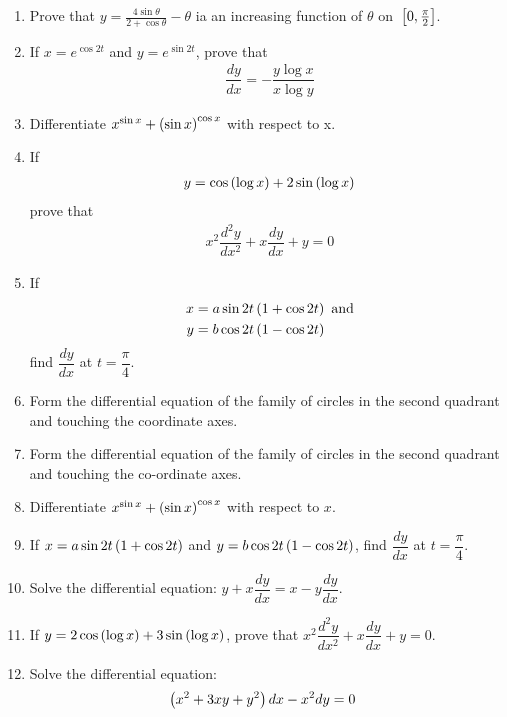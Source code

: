 \begin{enumerate}
    \item Prove that $ y = \frac{4\sin \theta}{2+ \cos \theta} - \theta$ ia an increasing function of $\theta$ on ${}\left[0,\frac{\pi}{2}\right]$.
    \item If $x=e^{\cos 2t}$ and $y=e^{\sin 2t}$, prove that
          \begin{align*}
              \dfrac{dy}{dx}= -\dfrac{y \log x}{x \log y}
          \end{align*}
    \item Differentiate $x^{\sin x}+ \left(\sin x\right)^{\cos x}$ with respect to x.
    \item If
          \begin{align*}
              y=\cos \left(\log x\right) + 2 \sin \left(\log x\right)
          \end{align*}
          prove that
          \begin{align*}
              x^2 \dfrac{d^2 y}{dx^2} + x \dfrac{dy}{dx} +y =0
          \end{align*}
    \item If
          \begin{align*}
              x & =a\sin 2t\left(1+\cos 2t\right) \text{ and} \\
              y & =b\cos 2t\left(1-\cos 2t\right)
          \end{align*}
          find $\dfrac{dy}{dx}$ at $t=\dfrac{\pi}{4}$.
    \item Form the differential equation of the family of circles in the second quadrant and touching the coordinate axes.
    \item Form the differential equation of the family of circles in the second quadrant and touching the co-ordinate axes.
    \item Differentiate $x^{\sin{x}} + \left(\sin{x}\right)^{\cos{x}}$ with respect to $x$.
    \item If $x = a\sin{2t}\left(1 + \cos{2t}\right)$ and $y = b\cos{2t}\left(1 - \cos{2t}\right)$, find $ \dfrac{dy}{dx}$ at $t = \dfrac{\pi}{4}$.
    \item Solve the differential equation: $y + x\dfrac{dy}{dx} = x - y\dfrac{dy}{dx}$.
    \item If $y = 2\cos{\ensuremath{\left(\log{x}\right)}} + 3\sin{\ensuremath{\left(\log{x}\right)}}$, prove that $x^2\dfrac{d^2y}{dx^2} + x\dfrac{dy}{dx} + y = 0$.
    \item Solve the differential equation:
          \begin{align*}
              \left(x^2 +3xy + y^2\right)dx - x^2dy & = 0
          \end{align*}

\end{enumerate}
